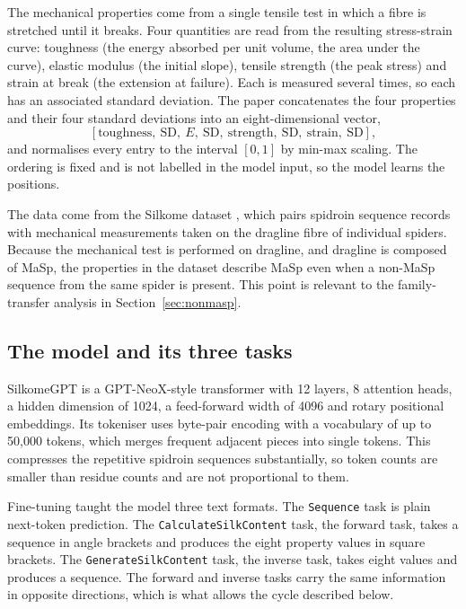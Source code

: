 \documentclass[11pt,a4paper]{article}
\begin{document}
The mechanical properties come from a single tensile test in which a fibre is
stretched until it breaks. Four quantities are read from the resulting
stress-strain curve: toughness (the energy absorbed per unit volume, the area
under the curve), elastic modulus (the initial slope), tensile strength (the
peak stress) and strain at break (the extension at failure). Each is measured
several times, so each has an associated standard deviation. The paper
concatenates the four properties and their four standard deviations into an
eight-dimensional vector,
\[
[\text{toughness},\ \text{SD},\ E,\ \text{SD},\ \text{strength},\ \text{SD},\
\text{strain},\ \text{SD}],
\]
and normalises every entry to the interval $[0,1]$ by min-max scaling. The
ordering is fixed and is not labelled in the model input, so the model learns
the positions.

The data come from the Silkome dataset \cite{arakawa2022}, which pairs spidroin
sequence records with mechanical measurements taken on the dragline fibre of
individual spiders. Because the mechanical test is performed on dragline, and
dragline is composed of MaSp, the properties in the dataset describe MaSp even
when a non-MaSp sequence from the same spider is present. This point is relevant
to the family-transfer analysis in Section~\ref{sec:nonmasp}.

\subsection{The model and its three tasks}

SilkomeGPT is a GPT-NeoX-style transformer with 12 layers, 8 attention heads, a
hidden dimension of 1024, a feed-forward width of 4096 and rotary positional
embeddings. Its tokeniser uses byte-pair encoding with a vocabulary of up to
50{,}000 tokens, which merges frequent adjacent pieces into single tokens. This
compresses the repetitive spidroin sequences substantially, so token counts are
smaller than residue counts and are not proportional to them.

Fine-tuning taught the model three text formats. The \texttt{Sequence} task is
plain next-token prediction. The \texttt{CalculateSilkContent} task, the forward
task, takes a sequence in angle brackets and produces the eight property values
in square brackets. The \texttt{GenerateSilkContent} task, the inverse task,
takes eight values and produces a sequence. The forward and inverse tasks carry
the same information in opposite directions, which is what allows the cycle
described below.
\end{document}
